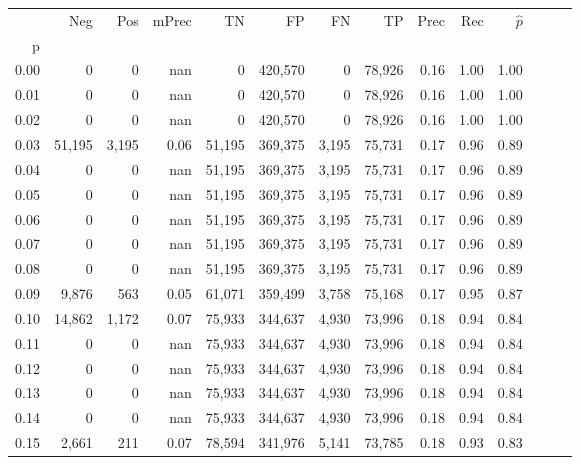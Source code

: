 \begin{tabular}{rrrrrrrrrrrrrr}
\toprule
{} &     Neg &    Pos & mPrec &       TN &       FP &      FN &      TP &  Prec &   Rec & $\hat{p}$ \\
p    &         &        &       &          &          &         &         &       &       &           \\
\midrule
0.00 &       0 &      0 &   nan &        0 &  420,570 &       0 &  78,926 &  0.16 &  1.00 &      1.00 \\
0.01 &       0 &      0 &   nan &        0 &  420,570 &       0 &  78,926 &  0.16 &  1.00 &      1.00 \\
0.02 &       0 &      0 &   nan &        0 &  420,570 &       0 &  78,926 &  0.16 &  1.00 &      1.00 \\
0.03 &  51,195 &  3,195 &  0.06 &   51,195 &  369,375 &   3,195 &  75,731 &  0.17 &  0.96 &      0.89 \\
0.04 &       0 &      0 &   nan &   51,195 &  369,375 &   3,195 &  75,731 &  0.17 &  0.96 &      0.89 \\
0.05 &       0 &      0 &   nan &   51,195 &  369,375 &   3,195 &  75,731 &  0.17 &  0.96 &      0.89 \\
0.06 &       0 &      0 &   nan &   51,195 &  369,375 &   3,195 &  75,731 &  0.17 &  0.96 &      0.89 \\
0.07 &       0 &      0 &   nan &   51,195 &  369,375 &   3,195 &  75,731 &  0.17 &  0.96 &      0.89 \\
0.08 &       0 &      0 &   nan &   51,195 &  369,375 &   3,195 &  75,731 &  0.17 &  0.96 &      0.89 \\
0.09 &   9,876 &    563 &  0.05 &   61,071 &  359,499 &   3,758 &  75,168 &  0.17 &  0.95 &      0.87 \\
0.10 &  14,862 &  1,172 &  0.07 &   75,933 &  344,637 &   4,930 &  73,996 &  0.18 &  0.94 &      0.84 \\
0.11 &       0 &      0 &   nan &   75,933 &  344,637 &   4,930 &  73,996 &  0.18 &  0.94 &      0.84 \\
0.12 &       0 &      0 &   nan &   75,933 &  344,637 &   4,930 &  73,996 &  0.18 &  0.94 &      0.84 \\
0.13 &       0 &      0 &   nan &   75,933 &  344,637 &   4,930 &  73,996 &  0.18 &  0.94 &      0.84 \\
0.14 &       0 &      0 &   nan &   75,933 &  344,637 &   4,930 &  73,996 &  0.18 &  0.94 &      0.84 \\
0.15 &   2,661 &    211 &  0.07 &   78,594 &  341,976 &   5,141 &  73,785 &  0.18 &  0.93 &      0.83 \\

\end{tabular}
